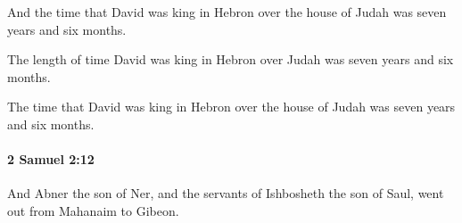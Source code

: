 			\begin{versebox}
					\item[BHS] 
					\item[ASV] And the time that David was king in Hebron over the house of Judah was seven years and six months.
					\item[NIV] The length of time David was king in Hebron over Judah was seven years and six months.
					\item[NRSV] The time that David was king in Hebron over the house of Judah was seven years and six months.
			\end{versebox}

		\paragraph{2 Samuel 2:12} %
			\label{2SAMUEL-2-12}

			And Abner the son of Ner, and the servants of Ishbosheth the son of Saul, went out from Mahanaim to Gibeon.

